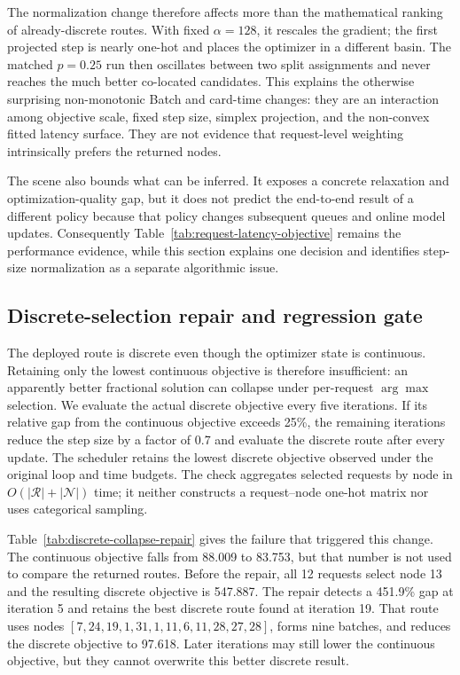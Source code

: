 \documentclass[10pt]{article}
\begin{document}
The normalization change therefore affects more than the mathematical ranking
of already-discrete routes. With fixed $\alpha=128$, it rescales the gradient;
the first projected step is nearly one-hot and places the optimizer in a
different basin. The matched $p=0.25$ run then oscillates between two split
assignments and never reaches the much better co-located candidates. This
explains the otherwise surprising non-monotonic Batch and card-time changes:
they are an interaction among objective scale, fixed step size, simplex
projection, and the non-convex fitted latency surface. They are not evidence
that request-level weighting intrinsically prefers the returned nodes.

The scene also bounds what can be inferred. It exposes a concrete relaxation
and optimization-quality gap, but it does not predict the end-to-end result of
a different policy because that policy changes subsequent queues and online
model updates. Consequently Table~\ref{tab:request-latency-objective} remains
the performance evidence, while this section explains one decision and
identifies step-size normalization as a separate algorithmic issue.

\subsection{Discrete-selection repair and regression gate}
\label{sec:discrete-repair}

The deployed route is discrete even though the optimizer state is continuous.
Retaining only the lowest continuous objective is therefore insufficient: an
apparently better fractional solution can collapse under per-request
$\arg\max$ selection. We evaluate the actual discrete objective every five
iterations. If its relative gap from the continuous objective exceeds 25\%,
the remaining iterations reduce the step size by a factor of 0.7 and evaluate
the discrete route after every update. The scheduler retains the lowest
discrete objective observed under the original loop and time budgets. The
check aggregates selected requests by node in $O(|\mathcal R|+|\mathcal N|)$
time; it neither constructs a request--node one-hot matrix nor uses
categorical sampling.

Table~\ref{tab:discrete-collapse-repair} gives the failure that triggered this
change. The continuous objective falls from 88.009 to 83.753, but that number
is not used to compare the returned routes. Before the repair, all 12 requests
select node 13 and the resulting discrete objective is 547.887. The repair
detects a 451.9\% gap at iteration 5 and retains the best discrete route found
at iteration 19. That route uses nodes
$[7,24,19,1,31,1,11,6,11,28,27,28]$, forms nine batches, and reduces the
discrete objective to 97.618. Later iterations may still lower the continuous
objective, but they cannot overwrite this better discrete result.
\end{document}

